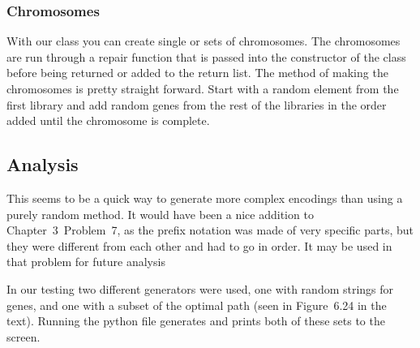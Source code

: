 \subsubsection{Chromosomes}
With our class you can create single or sets of chromosomes. The chromosomes are run through a repair function that is passed into the constructor of the class before being returned or added to the return list. The method of making the chromosomes is pretty straight forward. Start with a random element from the first library and add random genes from the rest of the libraries in the order added until the chromosome is complete.

\subsection{Analysis}
This seems to be a quick way to generate more complex encodings than using a purely random method. It would have been a nice addition to Chapter~3~Problem~7, as the prefix notation was made of very specific parts, but they were different from each other and had to go in order. It may be used in that problem for future analysis

In our testing two different generators were used, one with random strings for genes, and one with a subset of the optimal path (seen in Figure~6.24 in the text). Running the python file generates and prints both of these sets to the screen.